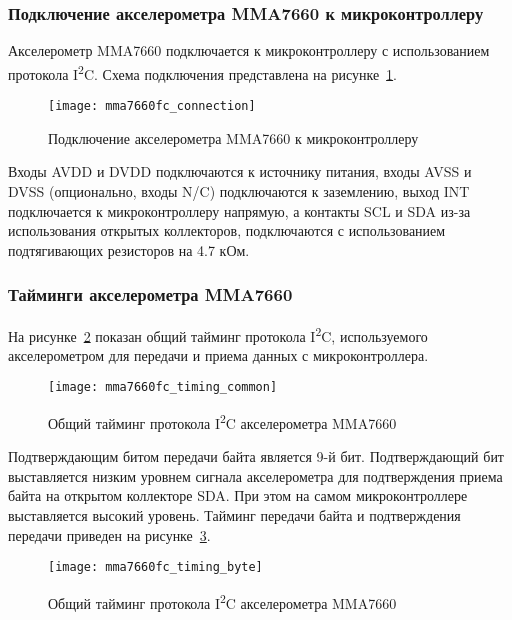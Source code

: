 \documentclass[document.tex]{subfiles}
\begin{document}
\clearpage
\subsubsection{Подключение акселерометра MMA7660 к микроконтроллеру}
Акселерометр MMA7660 подключается к микроконтроллеру с использова\-нием протокола I\textsuperscript{2}C. Схема подключения представлена на рисунке~\ref{fig:mma7660fc_connection}.

\begin{figure}[h]
\centering
\texttt{[image: mma7660fc\_connection]}
\caption{Подключение акселерометра MMA7660 к микроконтроллеру}
\label{fig:mma7660fc_connection}
\end{figure}

Входы AVDD и DVDD подключаются к источнику питания, входы AVSS и DVSS (опцио\-нально, входы N/C) подключаются к заземлению, выход INT подключается к микрокон\-троллеру
напрямую, а контакты SCL и SDA из-за использования открытых коллекторов, подключаются с использованием подтя\-гивающих резисторов на 4.7 кОм.\cite{accelerometer_mma7660, basics}

\clearpage
\subsubsection{Тайминги акселерометра MMA7660}
На рисунке~\ref{fig:mma7660fc_timing_common} показан общий тайминг протокола I\textsuperscript{2}C, используемого акселе\-рометром для передачи и приема данных с микроконтроллера.
\begin{figure}[h]
\centering
\texttt{[image: mma7660fc\_timing\_common]}
\caption{Общий тайминг протокола I\textsuperscript{2}C акселерометра MMA7660}
\label{fig:mma7660fc_timing_common}
\end{figure}

Подтверждающим битом передачи байта является 9-й бит. Подтверждающий бит выстав\-ляется низким уровнем сигнала акселерометра для подтверждения приема байта на открытом коллекторе
SDA. При этом на самом микроконтрол\-лере выставляется высокий уровень. Тайминг передачи байта и подтверждения передачи приведен на
рисунке~\ref{fig:mma7660fc_timing_byte}.\cite{accelerometer_mma7660}

\begin{figure}[h]
\centering
\texttt{[image: mma7660fc\_timing\_byte]}
\caption{Общий тайминг протокола I\textsuperscript{2}C акселерометра MMA7660}
\label{fig:mma7660fc_timing_byte}
\end{figure}
\end{document}
